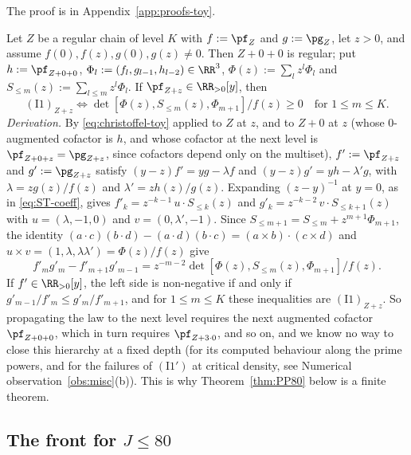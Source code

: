 The proof is in Appendix~\ref{app:proofs-toy}.

\begin{remark}\label{rem:windowP}
Let $Z$ be a regular chain of level $K$ with $f:=\pf_Z$ and $g:=\pg_Z$, let $z>0$, and assume $f(0),f(z),g(0),g(z)\ne0$.
Then $Z+0+0$ is regular; put $h:=\pf_{Z+0+0}$, $\Phi_l:=(f_l,g_{l-1},h_{l-2})\in\RR^3$, $\Phi(z):=\sum_lz^l\Phi_l$ and
$S_{\le m}(z):=\sum_{l\le m}z^l\Phi_l$. If $\pf_{Z+z}\in\RR_{>0}[y]$, then
\begin{equation}\label{eq:window}
(\mathrm{I1})_{Z+z}\iff\det[\Phi(z),S_{\le m}(z),\Phi_{m+1}]/f(z)\ge0\quad\text{for }1\le m\le K .
\end{equation}
\emph{Derivation.} By \eqref{eq:christoffel-toy} applied to $Z$ at $z$, and to $Z+0$ at $z$ (whose $0$-augmented cofactor is
$h$, and whose cofactor at the next level is $\pf_{Z+0+z}=\pg_{Z+z}$, since cofactors depend only on the multiset),
$f':=\pf_{Z+z}$ and $g':=\pg_{Z+z}$ satisfy $(y-z)f'=yg-\lambda f$ and $(y-z)g'=yh-\lambda'g$, with $\lambda=zg(z)/f(z)$ and
$\lambda'=zh(z)/g(z)$. Expanding $(z-y)^{-1}$ at $y=0$, as in \eqref{eq:ST-coeff}, gives $f'_k=z^{-k-1}\,u\cdot S_{\le k}(z)$ and
$g'_k=z^{-k-2}\,v\cdot S_{\le k+1}(z)$ with $u=(\lambda,-1,0)$ and $v=(0,\lambda',-1)$. Since
$S_{\le m+1}=S_{\le m}+z^{m+1}\Phi_{m+1}$, the identity $(a\cdot c)(b\cdot d)-(a\cdot d)(b\cdot c)=(a\times b)\cdot(c\times d)$ and
$u\times v=(1,\lambda,\lambda\lambda')=\Phi(z)/f(z)$ give
\[
f'_mg'_m-f'_{m+1}g'_{m-1}=z^{-m-2}\det[\Phi(z),S_{\le m}(z),\Phi_{m+1}]/f(z).
\]
If $f'\in\RR_{>0}[y]$, the left side is non-negative if and only if $g'_{m-1}/f'_m\le g'_m/f'_{m+1}$, and for $1\le m\le K$ these
inequalities are $(\mathrm{I1})_{Z+z}$. So propagating the law to the next level requires the next augmented cofactor
$\pf_{Z+0+0}$, which in turn requires $\pf_{Z+3\cdot0}$, and so on, and we know no way to close this hierarchy at a fixed depth
(for its computed behaviour along the prime powers, and for the failures of $(\mathrm{I1}')$ at critical density, see
Numerical observation~\ref{obs:misc}(b)). This is why Theorem~\ref{thm:PP80} below is a finite theorem.
\end{remark}

\subsection{The front for \texorpdfstring{$J\le 80$}{J <= 80}}\label{ssec:PP80}

